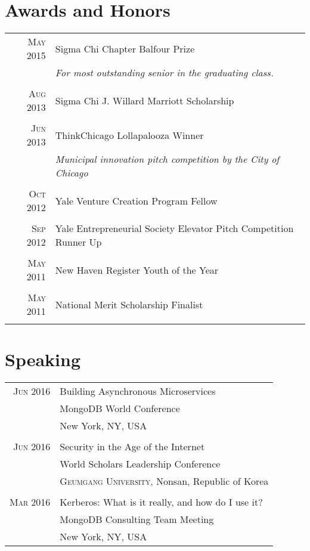 \documentclass[a4paper,10pt]{article}
\begin{document}
\section{Awards and Honors}
\begin{tabular}{rp{11cm}}
 \textsc{May} 2015 & Sigma Chi Chapter Balfour Prize \\
 							    & \small\emph{For most outstanding senior in the graduating class.} \\
 \multicolumn{2}{c}{} \\
 \textsc{Aug} 2013 & Sigma Chi J. Willard Marriott Scholarship \\
 \multicolumn{2}{c}{} \\
 \textsc{Jun} 2013 & ThinkChicago Lollapalooza Winner \\
 							    & \small\emph{Municipal innovation pitch competition by the City of Chicago} \\
 \multicolumn{2}{c}{} \\
 \textsc{Oct} 2012 & Yale Venture Creation Program Fellow \\
 \multicolumn{2}{c}{} \\	
 \textsc{Sep} 2012 & Yale Entrepreneurial Society Elevator Pitch Competition Runner Up \\
 \multicolumn{2}{c}{} \\
 \textsc{May} 2011 & New Haven Register Youth of the Year \\
 \multicolumn{2}{c}{} \\
 \textsc{May} 2011 & National Merit Scholarship Finalist \\
 \multicolumn{2}{c}{} \\
\end{tabular}

\section{Speaking}
\begin{tabular}{rp{11cm}}
 \textsc{Jun} 2016 & Building Asynchronous Microservices \\
 								 & MongoDB World Conference\\
 								 & New York, NY, USA  \\
 \multicolumn{2}{c}{} \\
 \textsc{Jun} 2016 & Security in the Age of the Internet\\
 							    &  World Scholars Leadership Conference\\
 							    &  \textsc{Geumgang University}, Nonsan, Republic of Korea \\
 \multicolumn{2}{c}{} \\
 \textsc{Mar} 2016 & Kerberos: What is it really, and how do I use it?\\
 							    &  MongoDB Consulting Team Meeting\\
 							    &  New York, NY, USA \\
\end{tabular}
\end{document}
